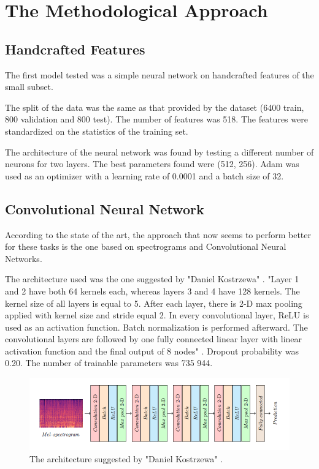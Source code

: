 \section{The Methodological Approach}


\subsection{Handcrafted Features}
The first model tested was a simple neural network on handcrafted features of the small subset.

The split of the data was the same as that provided by the dataset (6400 train, 800 validation and 800 test).
The number of features was 518. The features were standardized on the statistics of the training set.

The architecture of the neural network was found by testing a different number of neurons for two layers.
The best parameters found were (512, 256).
Adam was used as an optimizer with a learning rate of 0.0001 and a batch size of 32.

\subsection{Convolutional Neural Network}
According to the state of the art\cite{zeng2019spectrogram}, the approach that now seems to perform better for these tasks is the one based on spectrograms and Convolutional Neural Networks.

The architecture used was the one suggested by "Daniel Kostrzewa" \cite{kostrzewa2021music}.
"Layer 1 and 2 have both 64 kernels each, whereas layers 3 and 4 have 128 kernels. The kernel size of all layers is equal to 5. After each layer, there is 2-D max pooling applied with kernel size and stride equal 2. In every convolutional layer, ReLU is used as an activation function. Batch normalization is performed afterward. The convolutional layers are followed by one fully connected linear layer with linear activation function and the final output of 8 nodes" \cite{kostrzewa2021music}. Dropout probability was 0.20. The number of trainable parameters was 735 944.

\begin{figure}[ht]
    \centering
    \includegraphics[scale=0.6]{images/CNN-architecture.png}
    \caption{The architecture suggested by "Daniel Kostrzewa" \cite{kostrzewa2021music}.}
    \label{fig:CNN-architecture}
\end{figure}

